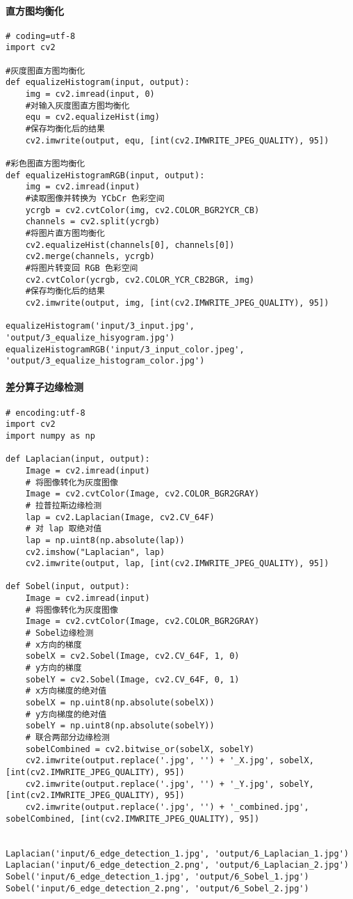 \documentclass[11pt]{ctexart}
\begin{document}
\paragraph{直方图均衡化}

\lstset{language=python}
\begin{lstlisting}
# coding=utf-8
import cv2

#灰度图直方图均衡化
def equalizeHistogram(input, output):
	img = cv2.imread(input, 0)
	#对输入灰度图直方图均衡化
	equ = cv2.equalizeHist(img)
	#保存均衡化后的结果
	cv2.imwrite(output, equ, [int(cv2.IMWRITE_JPEG_QUALITY), 95])

#彩色图直方图均衡化
def equalizeHistogramRGB(input, output):
	img = cv2.imread(input)
	#读取图像并转换为 YCbCr 色彩空间
	ycrgb = cv2.cvtColor(img, cv2.COLOR_BGR2YCR_CB)
	channels = cv2.split(ycrgb)
	#将图片直方图均衡化
	cv2.equalizeHist(channels[0], channels[0])
	cv2.merge(channels, ycrgb)
	#将图片转变回 RGB 色彩空间
	cv2.cvtColor(ycrgb, cv2.COLOR_YCR_CB2BGR, img)
	#保存均衡化后的结果
	cv2.imwrite(output, img, [int(cv2.IMWRITE_JPEG_QUALITY), 95])

equalizeHistogram('input/3_input.jpg', 'output/3_equalize_hisyogram.jpg')
equalizeHistogramRGB('input/3_input_color.jpeg', 'output/3_equalize_histogram_color.jpg')
\end{lstlisting}

\paragraph{差分算子边缘检测}

\lstset{language=python}
\begin{lstlisting}
# encoding:utf-8
import cv2
import numpy as np

def Laplacian(input, output):
	Image = cv2.imread(input)
	# 将图像转化为灰度图像
	Image = cv2.cvtColor(Image, cv2.COLOR_BGR2GRAY)
	# 拉普拉斯边缘检测
	lap = cv2.Laplacian(Image, cv2.CV_64F)
	# 对 lap 取绝对值
	lap = np.uint8(np.absolute(lap))
	cv2.imshow("Laplacian", lap)
	cv2.imwrite(output, lap, [int(cv2.IMWRITE_JPEG_QUALITY), 95])

def Sobel(input, output):
	Image = cv2.imread(input)
	# 将图像转化为灰度图像
	Image = cv2.cvtColor(Image, cv2.COLOR_BGR2GRAY)
	# Sobel边缘检测
	# x方向的梯度
	sobelX = cv2.Sobel(Image, cv2.CV_64F, 1, 0)
	# y方向的梯度
	sobelY = cv2.Sobel(Image, cv2.CV_64F, 0, 1)
	# x方向梯度的绝对值
	sobelX = np.uint8(np.absolute(sobelX))
	# y方向梯度的绝对值
	sobelY = np.uint8(np.absolute(sobelY))
	# 联合两部分边缘检测
	sobelCombined = cv2.bitwise_or(sobelX, sobelY)
	cv2.imwrite(output.replace('.jpg', '') + '_X.jpg', sobelX, [int(cv2.IMWRITE_JPEG_QUALITY), 95])
	cv2.imwrite(output.replace('.jpg', '') + '_Y.jpg', sobelY, [int(cv2.IMWRITE_JPEG_QUALITY), 95])
	cv2.imwrite(output.replace('.jpg', '') + '_combined.jpg', sobelCombined, [int(cv2.IMWRITE_JPEG_QUALITY), 95])


Laplacian('input/6_edge_detection_1.jpg', 'output/6_Laplacian_1.jpg')
Laplacian('input/6_edge_detection_2.png', 'output/6_Laplacian_2.jpg')
Sobel('input/6_edge_detection_1.jpg', 'output/6_Sobel_1.jpg')
Sobel('input/6_edge_detection_2.png', 'output/6_Sobel_2.jpg')
\end{lstlisting}
\end{document}
